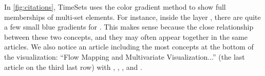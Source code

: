 In \autoref{fig:citations}, TimeSets uses the color gradient method to show full memberships of multi-set elements. For instance, inside the \tsnetwork{} layer , there are quite a few small blue gradients for \tsgraph. This makes sense because the close relationship between these two concepts, and they may often appear together in the same articles. We also notice an article including the most concepts at the bottom of the visualization: ``Flow Mapping and Multivariate Visualization...'' (the last article on the third last row) with \tshierarchy, \tsinteraction, \tsgraph, \tsoverview{} and \tsnetwork.